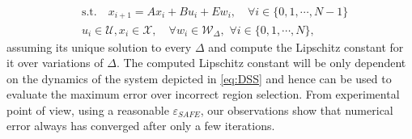 {\begin{align*}
&\text{s.t.} \quad x_{i+1}=Ax_i+Bu_i + E w_i, \quad\forall i\in\{0,1,\cdots,N-1\}\nonumber\\
&u_i\in\mathcal{U},x_i\in\mathcal{X},\quad \forall w_i\in\mathcal{W}_{\Delta},\,\,\forall i\in\{0,1,\cdots,N\},
\end{align*}
 assuming its unique solution to every $\Delta$ and compute the Lipschitz constant for it over variations of $\Delta$. The computed Lipschitz constant will be only dependent on the dynamics of the system depicted in \autoref{eq:DSS} and hence can be used to evaluate the maximum error over incorrect region selection. From experimental point of view, using a reasonable $\varepsilon_{SAFE}$, our observations show that numerical error always has converged after only a few iterations.
}
